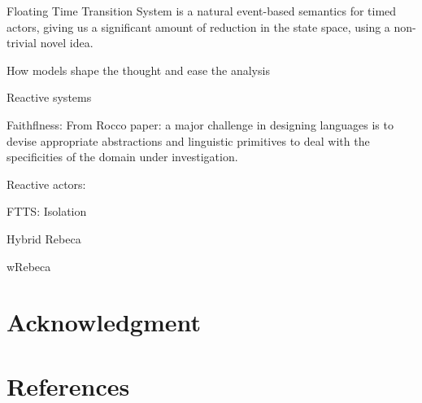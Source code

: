 \documentclass[conference]{IEEEtran}
\begin{document}
Floating Time Transition System is a natural event-based semantics for timed actors, giving us a significant amount of reduction in the state space, using a non-trivial novel idea.

How models shape the thought and ease the analysis


Reactive systems

Faithflness:
From Rocco paper: a major challenge in designing languages is to devise appropriate abstractions and linguistic primitives to deal with the specificities of the domain under investigation.

Reactive actors: 

FTTS: Isolation

Hybrid Rebeca

wRebeca


\section*{Acknowledgment}
\section*{References}



\begin{thebibliography}{00}

\end{thebibliography}
\end{document}
